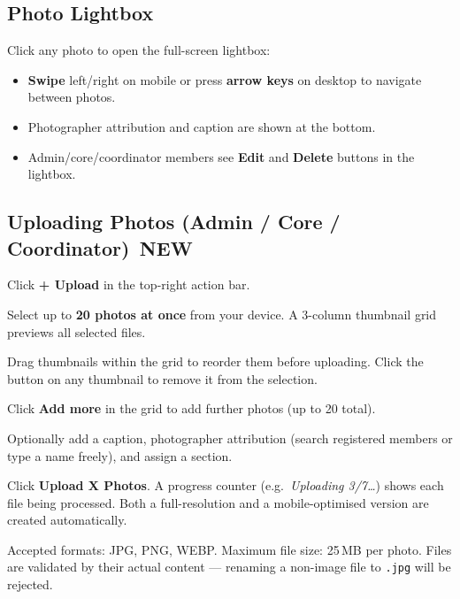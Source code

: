 \documentclass[12pt,a4paper]{article}
\newcommand{\newbadge}{%
  \colorbox{NewFrame}{\color{white}\,\textbf{\footnotesize NEW}\,}%
}
\begin{document}
\subsection{Photo Lightbox}

Click any photo to open the full-screen lightbox:

\begin{itemize}
  \item \textbf{Swipe} left/right on mobile or press \textbf{arrow keys} on desktop to navigate between photos.
  \item Photographer attribution and caption are shown at the bottom.
  \item Admin/core/coordinator members see \textbf{Edit} and \textbf{Delete} buttons in the lightbox.
\end{itemize}

\subsection{Uploading Photos (Admin / Core / Coordinator) \newbadge}

\begin{steps}
\item Click \textbf{+ Upload} in the top-right action bar.
\item Select up to \textbf{20 photos at once} from your device. A 3-column thumbnail grid previews all selected files.
\item Drag thumbnails within the grid to reorder them before uploading. Click the \textbf{\texttimes} button on any thumbnail to remove it from the selection.
\item Click \textbf{Add more} in the grid to add further photos (up to 20 total).
\item Optionally add a caption, photographer attribution (search registered members or type a name freely), and assign a section.
\item Click \textbf{Upload X Photos}. A progress counter (e.g.\ \textit{Uploading 3/7\ldots}) shows each file being processed. Both a full-resolution and a mobile-optimised version are created automatically.
\end{steps}

\begin{tipbox}
Accepted formats: JPG, PNG, WEBP. Maximum file size: 25\,MB per photo. Files are validated by their actual content --- renaming a non-image file to \texttt{.jpg} will be rejected.
\end{tipbox}
\end{document}
